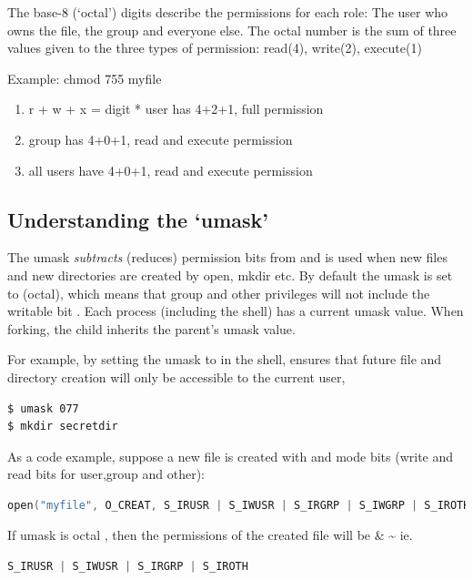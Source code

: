 The base-8 (`octal') digits describe the permissions for each role: The user who owns the file, the group and everyone else. The octal number is the sum of three values given to the three types of permission: read(4), write(2), execute(1)

Example: chmod 755 myfile

\begin{enumerate}
\item r + w + x = digit * user has 4+2+1, full permission
\item group has 4+0+1, read and execute permission
\item all users have 4+0+1, read and execute permission
\end{enumerate}

\subsection{Understanding the `umask'}

The umask \emph{subtracts} (reduces) permission bits from  and is used when new files and new directories are created by open, mkdir etc. By default the umask is set to  (octal), which means that group and other privileges will not include the writable bit . Each process (including the shell) has a current umask value. When forking, the child inherits the parent's umask value.

For example, by setting the umask to  in the shell, ensures that future file and directory creation will only be accessible to the current user,

\begin{verbatim}
$ umask 077
$ mkdir secretdir
\end{verbatim}

As a code example, suppose a new file is created with  and mode bits  (write and read bits for user,group and other):

\begin{lstlisting}[language=C]
open("myfile", O_CREAT, S_IRUSR | S_IWUSR | S_IRGRP | S_IWGRP | S_IROTH | S_IWOTH);
\end{lstlisting}

If umask is octal , then the permissions of the created file will be  \& \textasciitilde{} ie.

\begin{lstlisting}[language=C]
S_IRUSR | S_IWUSR | S_IRGRP | S_IROTH
\end{lstlisting}

